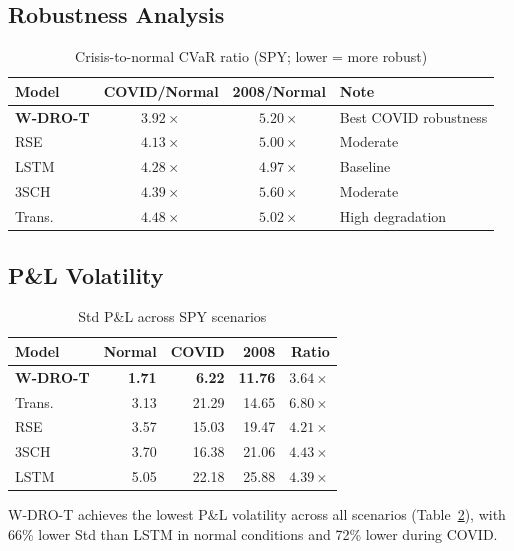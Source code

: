 \documentclass[11pt]{article}
\begin{document}
\subsection{Robustness Analysis}

\begin{table}[t]
\centering
\caption{Crisis-to-normal CVaR ratio (SPY; lower = more robust)}
\label{tab:robustness}
\small
\begin{tabular}{lccl}
\toprule
\textbf{Model} & \textbf{COVID/Normal} & \textbf{2008/Normal} & \textbf{Note} \\
\midrule
\textbf{W-DRO-T} & $\mathbf{3.92\times}$ & $5.20\times$ & Best COVID robustness \\
RSE & $4.13\times$ & $5.00\times$ & Moderate \\
LSTM & $4.28\times$ & $4.97\times$ & Baseline \\
3SCH & $4.39\times$ & $5.60\times$ & Moderate \\
Trans. & $4.48\times$ & $5.02\times$ & High degradation \\
\bottomrule
\end{tabular}
\end{table}

\subsection{P\&L Volatility}

\begin{table}[t]
\centering
\caption{Std P\&L across SPY scenarios}
\label{tab:std}
\small
\begin{tabular}{lrrrr}
\toprule
\textbf{Model} & \textbf{Normal} & \textbf{COVID} & \textbf{2008} & \textbf{Ratio} \\
\midrule
\textbf{W-DRO-T} & \textbf{1.71} & \textbf{6.22} & \textbf{11.76} & $3.64\times$ \\
Trans. & 3.13 & 21.29 & 14.65 & $6.80\times$ \\
RSE & 3.57 & 15.03 & 19.47 & $4.21\times$ \\
3SCH & 3.70 & 16.38 & 21.06 & $4.43\times$ \\
LSTM & 5.05 & 22.18 & 25.88 & $4.39\times$ \\
\bottomrule
\end{tabular}
\end{table}

W-DRO-T achieves the lowest P\&L volatility across all scenarios (Table~\ref{tab:std}), with 66\% lower Std than LSTM in normal conditions and 72\% lower during COVID.
\end{document}
